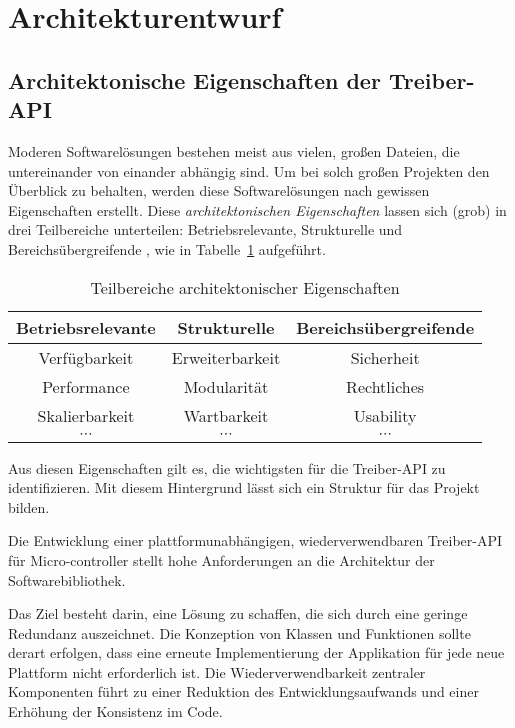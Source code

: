 \section{Architekturentwurf}

\label{sec:architecture_properties}
\subsection{Architektonische Eigenschaften der Treiber-API}
Moderen Softwarelösungen bestehen meist aus vielen, großen Dateien, die untereinander von einander abhängig sind.
Um bei solch großen Projekten den Überblick zu behalten, werden diese Softwarelösungen nach gewissen Eigenschaften erstellt.
Diese \emph{architektonischen Eigenschaften} lassen sich (grob) in drei Teilbereiche unterteilen: Betriebsrelevante, Strukturelle und Bereichsübergreifende \cite{barlik_architektur}, wie in Tabelle~\ref{tab:architektonische_eigenschaften} aufgeführt. %

\begin{table}[H]
	\begin{center}
		\begin{tabular}{ c | c | c }
		\toprule
			\textbf{Betriebsrelevante} & \textbf{Strukturelle} & \textbf{Bereichsübergreifende}\\
			\midrule
			Verfügbarkeit & Erweiterbarkeit & Sicherheit\\
			Performance & Modularität & Rechtliches\\
			Skalierbarkeit & Wartbarkeit & Usability\\
			$\cdots$ & $\cdots$ & $\cdots$\\
			\bottomrule
		\end{tabular}
		\caption{Teilbereiche architektonischer Eigenschaften}
	    \label{tab:architektonische_eigenschaften}
	\end{center}
\end{table}

Aus diesen Eigenschaften gilt es, die wichtigsten für die Treiber-API zu identifizieren. 
Mit diesem Hintergrund lässt sich ein Struktur für das Projekt bilden.

Die Entwicklung einer plattformunabhängigen, wiederverwendbaren Treiber-API für Micro-controller stellt hohe Anforderungen an die Architektur der Softwarebibliothek.

Das Ziel besteht darin, eine Lösung zu schaffen, die sich durch eine geringe Redundanz auszeichnet. 
Die Konzeption von Klassen und Funktionen sollte derart erfolgen, dass eine erneute Implementierung der Applikation für jede neue Plattform nicht erforderlich ist.
Die Wiederverwendbarkeit zentraler Komponenten führt zu einer Reduktion des Entwicklungsaufwands und einer Erhöhung der Konsistenz im Code.

